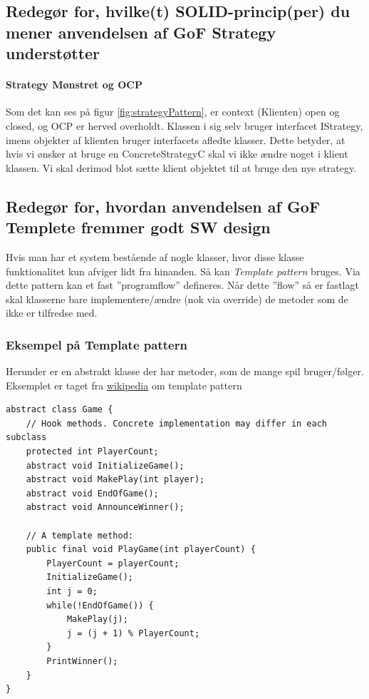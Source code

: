 \subsection{Redegør for, hvilke(t) SOLID-princip(per) du mener anvendelsen af GoF Strategy understøtter}

\paragraph{Strategy Mønstret og OCP}
Som det kan ses på figur \ref{fig:strategyPattern}, er context (Klienten) open og closed, og OCP er herved overholdt. Klassen i sig selv bruger interfacet IStrategy, imens objekter af klienten bruger interfacets afledte klasser. Dette betyder, at hvis vi ønsker at bruge en ConcreteStrategyC skal vi ikke ændre noget i klient klassen. Vi skal derimod blot sætte klient objektet til at bruge den nye strategy.

\subsection{Redegør for, hvordan anvendelsen af GoF Templete fremmer godt SW design}
Hvis man har et system bestående af nogle klasser, hvor disse klasse funktionalitet kun afviger lidt fra hinanden. Så kan \textit{Template pattern} bruges. Via dette pattern kan et fast ''programflow'' defineres. Når dette ''flow'' så er fastlagt skal klasserne bare implementere/ændre (nok via override) de metoder som de ikke er tilfredse med.

\subsubsection{Eksempel på Template pattern}
Herunder er en abstrakt klasse der har metoder, som de mange spil bruger/følger. Eksemplet er taget fra \href{https://en.wikipedia.org/wiki/Template_method_pattern#Example_in_Java}{wikipedia} om template pattern

\begin{lstlisting}
abstract class Game {
	// Hook methods. Concrete implementation may differ in each subclass
	protected int PlayerCount;
	abstract void InitializeGame();
	abstract void MakePlay(int player);
	abstract void EndOfGame();
	abstract void AnnounceWinner();
	
	// A template method:
	public final void PlayGame(int playerCount)	{
		PlayerCount = playerCount;
		InitializeGame();
		int j = 0;
		while(!EndOfGame()) {
			MakePlay(j);
			j = (j + 1) % PlayerCount;
		}
		PrintWinner();
	}
}
\end{lstlisting}

